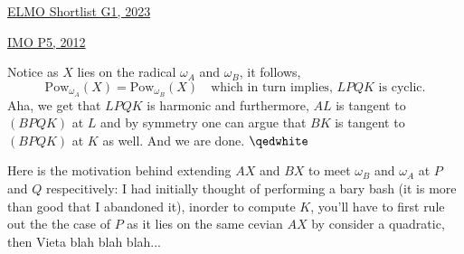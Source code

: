 \begin{problem}{14}{\href{https://artofproblemsolving.com/community/c6h3100572p28033718}{ELMO Shortlist G1, 2023}}
\begin{problem}{2}{\href{https://artofproblemsolving.com/community/c6h488511p2737425}{IMO P5, 2012}}
\begin{solution}
	\noindent Notice as $X$ lies on the radical $\omega_A$ and $\omega_B$, it follows, 
	$$\text{Pow}_{\omega_A}(X)=\text{Pow}_{\omega_B}(X)\quad\text{which in turn implies, $LPQK$ is cyclic.}$$
	Aha, we get that $LPQK$ is harmonic and furthermore, $AL$ is tangent to $(BPQK)$ at $L$ and by symmetry one can argue that $BK$ is tangent to $(BPQK)$ at $K$ as well. And we are done. $\qedwhite$\\
	
	\begin{remark}
	Here is the motivation behind extending $AX$ and $BX$ to meet $\omega_B$ and $\omega_A$ at $P$ and $Q$  respecitively: I had initially thought of performing a bary bash (it is more than good that I abandoned it), inorder to compute $K$, you'll have to first rule out the the case of $P$ as it lies on the same cevian $AX$ by consider a quadratic, then Vieta blah blah blah...
	\end{remark}
	\end{solution}
\end{problem}
	

\end{problem}
